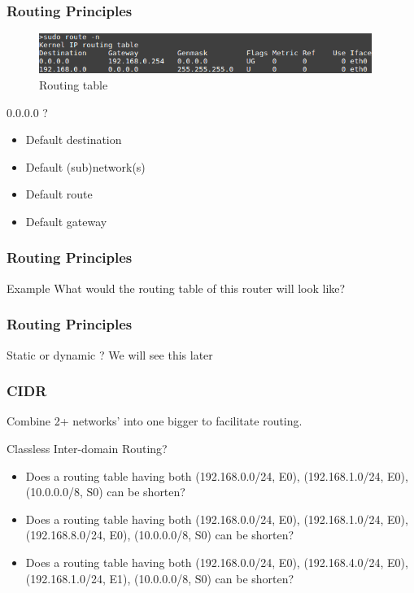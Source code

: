   \begin{frame}
    \frametitle{Routing Principles}
    \begin{figure}[t]
      \centering
      \includegraphics[height=1.3cm]{./imgs/routing-table.png}
      \caption{Routing table}
      \label{fig:routing_table}
    \end{figure}
    \begin{block}{0.0.0.0 ?}
      \begin{itemize}
        \item Default destination
        \item Default (sub)network(s)
        \item Default route
        \item Default gateway
      \end{itemize}
    \end{block}
  \end{frame}

  \begin{frame}
    \frametitle{Routing Principles}
    \begin{block}{Example}
      What would the routing table of this router will look like?
    \end{block}
  \end{frame}

  \begin{frame}
    \frametitle{Routing Principles}
    \begin{block}{Static or dynamic ?}
      We will see this later
    \end{block}
  \end{frame}

  \begin{frame}
    \frametitle{CIDR}
    Combine 2+ networks' into one bigger to facilitate routing.

    \begin{block}{Classless Inter-domain Routing?}
      \begin{itemize}
        \item Does a routing table having both (192.168.0.0/24, E0), (192.168.1.0/24, E0), (10.0.0.0/8, S0) can be shorten?
        \item Does a routing table having both (192.168.0.0/24, E0), (192.168.1.0/24, E0), (192.168.8.0/24, E0), (10.0.0.0/8, S0) can be shorten?
        \item Does a routing table having both (192.168.0.0/24, E0), (192.168.4.0/24, E0), (192.168.1.0/24, E1), (10.0.0.0/8, S0) can be shorten?
      \end{itemize}
    \end{block}
  \end{frame}

